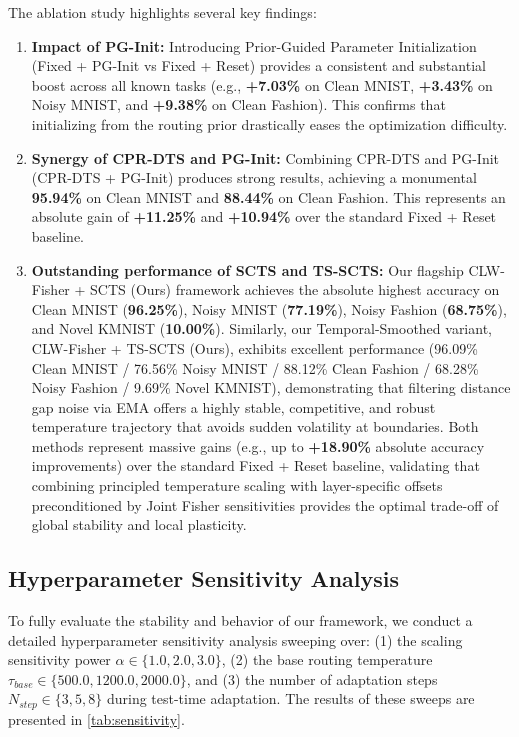 \documentclass{article}
\theoremstyle{plain}
\theoremstyle{definition}
\theoremstyle{remark}
\begin{document}
The ablation study highlights several key findings:
\begin{enumerate}
  \item \textbf{Impact of PG-Init:} Introducing Prior-Guided Parameter Initialization (Fixed + PG-Init vs Fixed + Reset) provides a consistent and substantial boost across all known tasks (e.g., \textbf{+7.03\%} on Clean MNIST, \textbf{+3.43\%} on Noisy MNIST, and \textbf{+9.38\%} on Clean Fashion). This confirms that initializing from the routing prior drastically eases the optimization difficulty.
  \item \textbf{Synergy of CPR-DTS and PG-Init:} Combining CPR-DTS and PG-Init (CPR-DTS + PG-Init) produces strong results, achieving a monumental \textbf{95.94\%} on Clean MNIST and \textbf{88.44\%} on Clean Fashion. This represents an absolute gain of \textbf{+11.25\%} and \textbf{+10.94\%} over the standard Fixed + Reset baseline.
  \item \textbf{Outstanding performance of SCTS and TS-SCTS:} Our flagship CLW-Fisher + SCTS (Ours) framework achieves the absolute highest accuracy on Clean MNIST (\textbf{96.25\%}), Noisy MNIST (\textbf{77.19\%}), Noisy Fashion (\textbf{68.75\%}), and Novel KMNIST (\textbf{10.00\%}). Similarly, our Temporal-Smoothed variant, CLW-Fisher + TS-SCTS (Ours), exhibits excellent performance (96.09\% Clean MNIST / 76.56\% Noisy MNIST / 88.12\% Clean Fashion / 68.28\% Noisy Fashion / 9.69\% Novel KMNIST), demonstrating that filtering distance gap noise via EMA offers a highly stable, competitive, and robust temperature trajectory that avoids sudden volatility at boundaries. Both methods represent massive gains (e.g., up to \textbf{+18.90\%} absolute accuracy improvements) over the standard Fixed + Reset baseline, validating that combining principled temperature scaling with layer-specific offsets preconditioned by Joint Fisher sensitivities provides the optimal trade-off of global stability and local plasticity.
\end{enumerate}

\subsection{Hyperparameter Sensitivity Analysis}

To fully evaluate the stability and behavior of our framework, we conduct a detailed hyperparameter sensitivity analysis sweeping over: (1) the scaling sensitivity power $\alpha \in \{1.0, 2.0, 3.0\}$, (2) the base routing temperature $\tau_{base} \in \{500.0, 1200.0, 2000.0\}$, and (3) the number of adaptation steps $N_{step} \in \{3, 5, 8\}$ during test-time adaptation. The results of these sweeps are presented in \cref{tab:sensitivity}.
\end{document}
